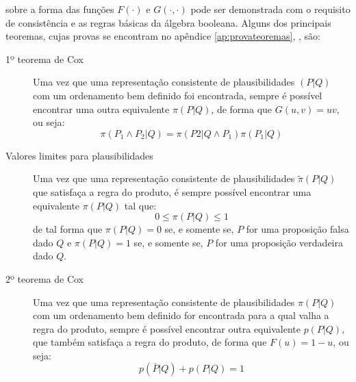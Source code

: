  sobre a forma das funções $F(\cdot)$ e $G(\cdot,\cdot)$ pode ser demonstrada com o requisito de consistência e as regras básicas da álgebra booleana. Alguns dos principais teoremas, cujas provas se encontram no apêndice \ref{ap:provateoremas}, \emph{}, são:
\begin{description}
 \item[1º teorema de Cox]
\begin{Teorema}
    Uma vez que uma representação consistente de plausibilidades $(P|Q)$ com um ordenamento bem definido foi encontrada, sempre é possível encontrar uma outra equivalente $\pi(P|Q)$, de forma que $G(u,v) = uv$, ou seja:
    \begin{equation}
	\label{eq:productrule}
	\pi(P_1\wedge P_2|Q) = \pi(P2 | Q \wedge P_1) \pi(P_1| Q)
    \end{equation}
\end{Teorema}

\item[Valores limites para plausibilidades]
\begin{Teorema}
  Uma vez que uma representação consistente de plausibilidades $\tilde{\pi}(P|Q)$ que satisfaça a regra do produto, é sempre possível encontrar uma equivalente $\pi(P|Q)$ tal que:
 \begin{equation}
    0 \le \pi(P|Q) \le 1
 \end{equation}
 de tal forma que $\pi(P|Q) = 0$ se, e somente se, $P$ for uma proposição falsa dado $Q$ e $\pi(P|Q) = 1$ se, e somente se, $P$ for uma proposição verdadeira dado $Q$.
\end{Teorema}
\item[2º teorema de Cox]
\begin{Teorema}
 Uma vez que uma representação consistente de plausibilidades $\pi(P|Q)$ com um ordenamento bem definido for encontrada para a qual valha a regra do produto, sempre é possível encontrar outra equivalente $p(P|Q)$, que também satisfaça a regra do produto, de forma que $F(u) = 1 - u$, ou seja:
 \begin{equation}
 \label{eq:normed}
 p(\bar{P} | Q) + p(P|Q) = 1
 \end{equation}
\end{Teorema}
\end{description}

